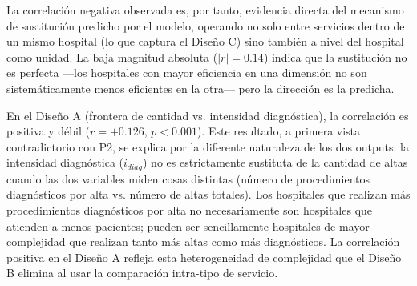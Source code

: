 La correlación negativa observada es, por tanto, evidencia directa del mecanismo de sustitución predicho por el modelo, operando no solo entre servicios dentro de un mismo hospital (lo que captura el Diseño C) sino también a nivel del hospital como unidad. La baja magnitud absoluta ($|r|=0.14$) indica que la sustitución no es perfecta ---los hospitales con mayor eficiencia en una dimensión no son sistemáticamente menos eficientes en la otra--- pero la dirección es la predicha.

En el Diseño A (frontera de cantidad vs. intensidad diagnóstica), la correlación es positiva y débil ($r=+0.126$, $p<0.001$). Este resultado, a primera vista contradictorio con P2, se explica por la diferente naturaleza de los dos outputs: la intensidad diagnóstica ($i_{diag}$) no es estrictamente sustituta de la cantidad de altas cuando las dos variables miden cosas distintas (número de procedimientos diagnósticos por alta vs. número de altas totales). Los hospitales que realizan más procedimientos diagnósticos por alta no necesariamente son hospitales que atienden a menos pacientes; pueden ser sencillamente hospitales de mayor complejidad que realizan tanto más altas como más diagnósticos. La correlación positiva en el Diseño A refleja esta heterogeneidad de complejidad que el Diseño B elimina al usar la comparación intra-tipo de servicio.


